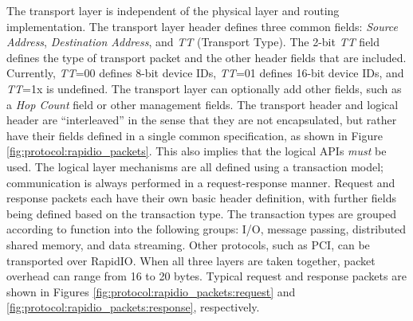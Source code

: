 The transport layer is independent of the physical layer and routing implementation. The transport layer header defines three common fields: \emph{Source Address}, \emph{Destination Address}, and \emph{TT} (Transport Type). The 2-bit \emph{TT} field defines the type of transport packet and the other header fields that are included. Currently, \emph{TT}=00 defines 8-bit device IDs, \emph{TT}=01 defines 16-bit device IDs, and \emph{TT}=1x is undefined. The transport layer can optionally add other fields, such as a \emph{Hop Count} field or other management fields. The transport header and logical header are ``interleaved'' in the sense that they are not encapsulated, but rather have their fields defined in a single common specification, as shown in Figure \ref{fig:protocol:rapidio_packets}. This also implies that the logical APIs \emph{must} be used. \cite{ref:2005-fuller-rapidio_the_embedded_interconnect}
The logical layer mechanisms are all defined using a transaction model; communication is always performed in a request-response manner. Request and response packets each have their own basic header definition, with further fields being defined based on the transaction type. The transaction types are grouped according to function into the following groups: I/O, message passing, distributed shared memory, and data streaming. Other protocols, such as PCI, can be transported over RapidIO. When all three layers are taken together, packet overhead can range from 16 to 20 bytes. Typical request and response packets are shown in Figures \ref{fig:protocol:rapidio_packets:request} and \ref{fig:protocol:rapidio_packets:response}, respectively. \cite{ref:2005-fuller-rapidio_the_embedded_interconnect}

